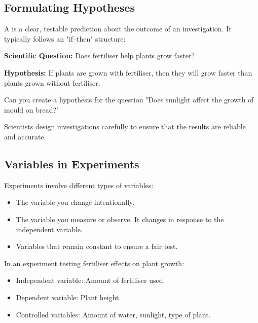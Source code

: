 
\subsection{Formulating Hypotheses}

A  is a clear, testable prediction about the outcome of an investigation. It typically follows an "if–then" structure:

\begin{example}
\textbf{Scientific Question:} Does fertiliser help plants grow faster?

\textbf{Hypothesis:} If plants are grown with fertiliser, then they will grow faster than plants grown without fertiliser.
\end{example}

\begin{stopandthink}
Can you create a hypothesis for the question "Does sunlight affect the growth of mould on bread?"
\end{stopandthink}

\FloatBarrier
\1

Scientists design investigations carefully to ensure that the results are reliable and accurate.

\subsection{Variables in Experiments}

Experiments involve different types of variables:

\begin{itemize}
    \item {} The variable you change intentionally.
    \item {} The variable you measure or observe. It changes in response to the independent variable.
    \item {} Variables that remain constant to ensure a fair test.
\end{itemize}

\begin{example}
In an experiment testing fertiliser effects on plant growth:

\begin{itemize}
    \item Independent variable: Amount of fertiliser used.
    \item Dependent variable: Plant height.
    \item Controlled variables: Amount of water, sunlight, type of plant.
\end{itemize}
\end{example}

